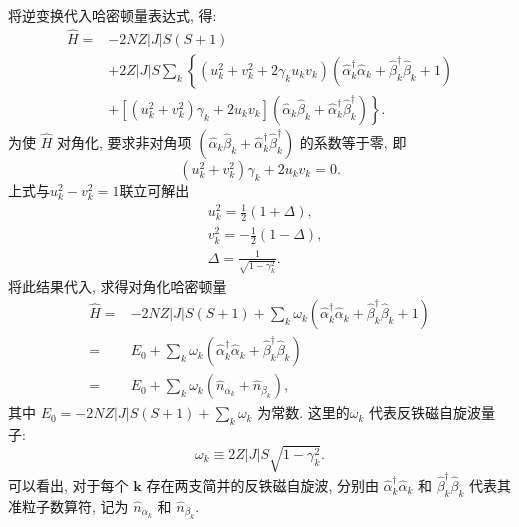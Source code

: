 将逆变换代入哈密顿量表达式, 得:
\begin{align}
\hat H=&-2 N Z|J| S(S+1)\nonumber\\
&+ 2 Z|J| S \sum_{k}\left\{\left(u_{k}^{2}+v_{k}^{2}+2 \gamma_{k} u_{k} v_{k}\right)\left(\hat \alpha_{k}^{\dagger} \hat \alpha^{}_{k}+\hat \beta_{k}^{\dagger} \hat \beta^{}_{k}+1\right)\right.\nonumber\\
&+\left.\left[\left(u_{k}^{2}+v_{k}^{2}\right) \gamma_{k}+2 u_{k} v_{k}\right]\left(\hat \alpha_{k} \hat \beta_{k}+\hat \alpha_{k}^{\dagger} \hat \beta_{k}^{\dagger}\right)\right\}.
\end{align}
为使 $\hat H$ 对角化, 要求非对角项 $\left(\hat \alpha_{k} \hat \beta_{k}+\hat \alpha_{k}^{\dagger} \hat \beta_{k}^{\dagger}\right)$ 的系数等于零, 即
\begin{equation}
\left(u_{k}^{2}+v_{k}^{2}\right) \gamma_{k}+2 u_{k} v_{k}=0.
\end{equation}
上式与$u_{k}^{2}-v_{k}^{2}=1$联立可解出
\begin{align}
&u_{k}^{2}=\frac{1}{2}(1+\Delta), \\
&v_{k}^{2}=-\frac{1}{2}(1-\Delta), \\
&\Delta=\frac{1}{\sqrt{1-\gamma_{k}^{2}}}.
\end{align}
将此结果代入, 求得对角化哈密顿量
\begin{align}
\hat H=&-2 N Z|J| S(S+1)+ \sum_{k}\omega_{k}\left(\hat \alpha_{k}^{\dagger} \hat \alpha^{}_{k}+\hat \beta_{k}^{\dagger} \hat \beta^{}_{k}+1\right)\nonumber\\
=&E_0+\sum_{k}\omega_{k}\left(\hat \alpha_{k}^{\dagger} \hat \alpha^{}_{k}+\hat \beta_{k}^{\dagger} \hat \beta^{}_{k}\right)\nonumber\\
=&E_0+\sum_{k}\omega_{k}\left(\hat n_{\alpha_{k}}+\hat n_{\beta_{k}}\right),
\end{align}
其中 $\displaystyle E_0=-2 N Z|J| S(S+1)+ \sum_{k}\omega_{k}$ 为常数. 这里的$\omega_{k}$ 代表反铁磁自旋波量子:
\begin{equation}
\omega_{k}\equiv 2 Z|J| S \sqrt{1-\gamma_{k}^{2}}.
\end{equation}
可以看出, 对于每个 $\boldsymbol{k}$ 存在两支简并的反铁磁自旋波, 分别由 $\hat \alpha_{k}^{\dagger} \hat \alpha^{}_{k}$ 和 $\hat \beta_{k}^{\dagger} \hat \beta^{}_{k}$ 代表其准粒子数算符, 记为 $\hat n_{\alpha_{k}}$ 和 $\hat n_{\beta_{k}}$.

